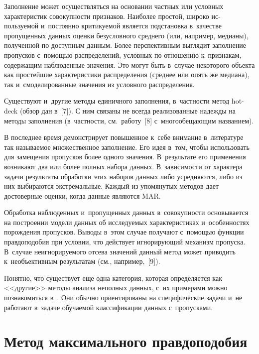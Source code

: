 \begin{multicols}{2}
     Заполнение может осуществляться на основании частных или условных 
характеристик совокуп\-ности признаков. Наиболее простой, широко 
ис-\linebreak пользуемой и~постоянно критикуемой является\linebreak
 подстановка в~качестве 
пропущенных данных оценки безусловного среднего (или, например, медианы), 
полученной по доступным данным. Более перспективным выглядит заполнение 
пропусков\linebreak
 с~по\-мощью распределений, условных по отношению к~признакам, 
содержащим наблюденные значения. Это могут быть в~случае некоторого 
объекта как простейшие характеристики распределения (среднее или опять же 
медиана), так и~смоделированные значения из условного распределения. 
     
     Существуют и~другие методы единичного заполнения, в~частности метод 
hot-deck (обзор дан в~[7]). С ним связаны не всегда реализованные надежды на 
методы заполнения (в~част\-ности, см.\ работу~[8] с~многообещающим 
названием).
     
     В последнее время демонстрирует повышенное к~себе внимание 
в~литературе так называемое множественное заполнение. Его идея в~том, 
чтобы использовать для замещения пропусков более одного значения. 
В~результате его применения возникают два или более полных набора данных. 
В~за\-ви\-си\-мости от характера задачи результаты обработки этих наборов данных 
либо усредняются, либо из них выбираются экстремальные. Каждый из 
упомянутых методов дает достоверные оценки, когда данные являются MAR.
     
     Обработка наблюденных и~пропущенных данных в~совокупности 
основывается на построении модели данных об исследуемых характеристиках 
и~особенностях порождения пропусков. Выводы в~этом случае получают с~по\-мощью 
функции правдоподобия при условии, что действует игно\-ри\-ру\-ющий 
механизм пропуска. В~случае неигнорируемого отсева значений данный метод 
может приводить к~необъективным результатам (см., например,~[9]). 
     
     Понятно, что существует еще одна категория, которая определяется как 
<<другие>> методы анализа неполных данных, с~их примерами можно 
познакомиться в~\cite{6-kri}. Они обычно ориентированы на специфические 
задачи и~не работают в~задаче обуча\-емой классификации данных с~пропусками.

\vspace*{-6pt}

\section{Метод максимального правдоподобия}


\end{multicols}
